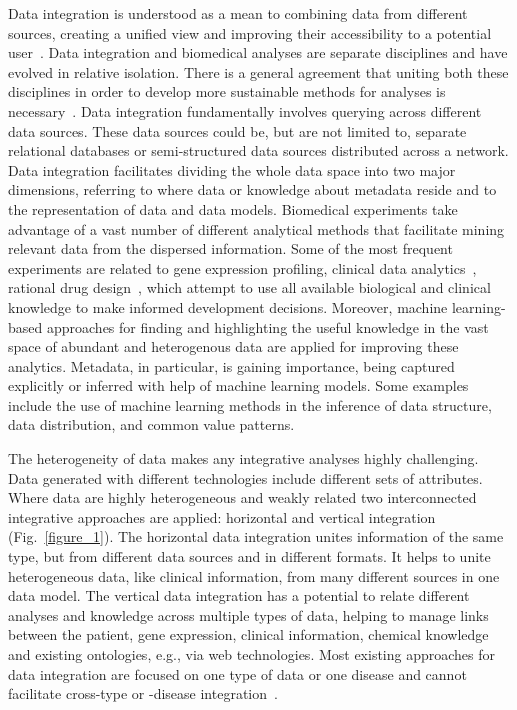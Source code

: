 \documentclass{bmcart}
\begin{document}
Data integration is understood as a mean to combining data from
different sources, creating a unified view and improving their
accessibility to a potential user~\cite{1,2,3}. Data integration and
biomedical analyses are separate disciplines and have evolved in
relative isolation. There is a general agreement that uniting both
these disciplines in order to develop more sustainable methods for
analyses is necessary~\cite{23,24}. Data integration fundamentally involves
querying across different data sources. These data sources could be,
but are not limited to, separate relational databases or
semi-structured data sources distributed across a network. Data
integration facilitates dividing the whole data space into two major
dimensions, referring to where data or knowledge about metadata reside
and to the representation of data and data models. Biomedical
experiments take advantage of a vast number of different analytical
methods that facilitate mining relevant data from the dispersed
information. Some of the most frequent experiments are related to gene
expression profiling, clinical data analytics~\cite{27}, rational drug
design~\cite{25, 26}, which attempt to use all available biological and
clinical knowledge to make informed development decisions. Moreover,
machine learning-based approaches for finding and highlighting the
useful knowledge in the vast space of abundant and heterogenous data
are applied for improving these analytics. Metadata, in particular, is
gaining importance, being captured explicitly or inferred with help of
machine learning models. Some examples include the use of machine
learning methods in the inference of data structure, data distribution,
and common value patterns.

The heterogeneity of data makes any integrative analyses highly
challenging. Data generated with different technologies include
different sets of attributes. Where data are highly heterogeneous and
weakly related two interconnected integrative approaches are applied:
horizontal and vertical integration (Fig.~\ref{figure_1}). The horizontal data
integration unites information of the same type, but from different
data sources and in different formats. It helps to unite heterogeneous
data, like clinical information, from many different sources in one
data model. The vertical data integration has a potential to relate
different analyses and knowledge across multiple types of data, helping
to manage links between the patient, gene expression, clinical
information, chemical knowledge and existing ontologies, e.g., via web
technologies. Most existing approaches for data integration are focused
on one type of data or one disease and cannot facilitate cross-type or
-disease integration~\cite{28,29}.
\end{document}
